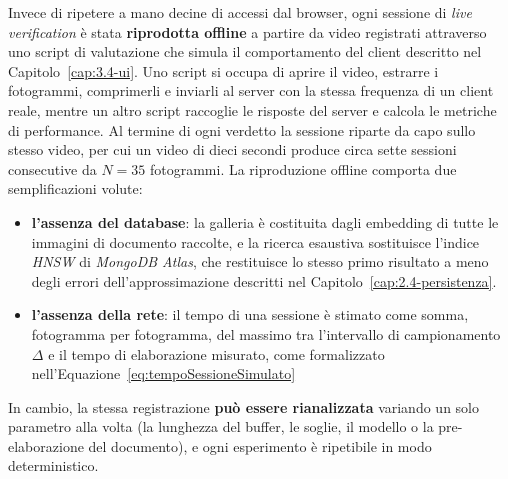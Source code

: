 Invece di ripetere a mano decine di accessi dal browser, ogni sessione di \textit{live verification} è stata \textbf{riprodotta offline} a partire da video registrati attraverso uno script di valutazione che simula il comportamento del client descritto nel Capitolo~\ref{cap:3.4-ui}.
Uno script si occupa di aprire il video, estrarre i fotogrammi, comprimerli e inviarli al server con la stessa frequenza di un client reale, mentre un altro script raccoglie le risposte del server e calcola le metriche di performance.
Al termine di ogni verdetto la sessione riparte da capo sullo stesso video, per cui un video di dieci secondi produce circa sette sessioni consecutive da $N = 35$ fotogrammi.
La riproduzione offline comporta due semplificazioni volute:
\begin{itemize}
    \item \textbf{l'assenza del database}: la galleria è costituita dagli embedding di tutte le immagini di documento raccolte, e la ricerca esaustiva sostituisce l'indice \textit{HNSW} di \textit{MongoDB Atlas}, che restituisce lo stesso primo risultato a meno degli errori dell'approssimazione descritti nel Capitolo~\ref{cap:2.4-persistenza}.
    \item \textbf{l'assenza della rete}: il tempo di una sessione è stimato come somma, fotogramma per fotogramma, del massimo tra l'intervallo di campionamento $\Delta$ e il tempo di elaborazione misurato, come formalizzato nell'Equazione~\eqref{eq:tempoSessioneSimulato}
\end{itemize}
In cambio, la stessa registrazione \textbf{può essere rianalizzata} variando un solo parametro alla volta (la lunghezza del buffer, le soglie, il modello o la pre-elaborazione del documento), e ogni esperimento è ripetibile in modo deterministico.


